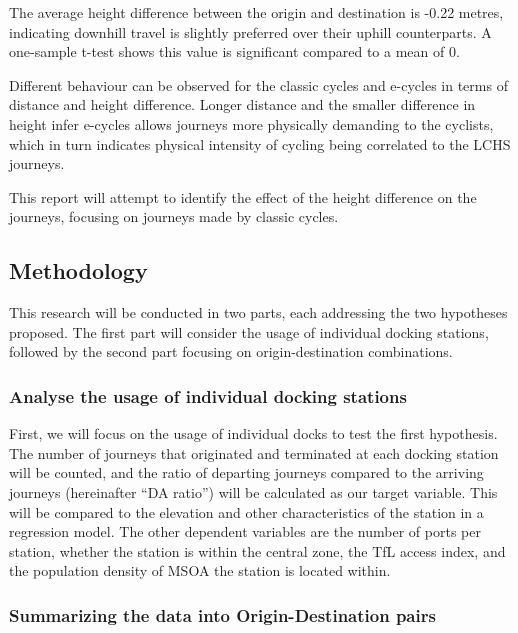 \documentclass[
  a4paper,
  DIV=11,
  numbers=noendperiod]{scrartcl}
\begin{document}
The average height difference between the origin and destination is
-0.22 metres, indicating downhill travel is slightly preferred over
their uphill counterparts. A one-sample t-test shows this value is
significant compared to a mean of 0.

Different behaviour can be observed for the classic cycles and e-cycles
in terms of distance and height difference. Longer distance and the
smaller difference in height infer e-cycles allows journeys more
physically demanding to the cyclists, which in turn indicates physical
intensity of cycling being correlated to the LCHS journeys.

This report will attempt to identify the effect of the height difference
on the journeys, focusing on journeys made by classic cycles.

\hypertarget{methodology}{%
\subsection{Methodology}\label{methodology}}

This research will be conducted in two parts, each addressing the two
hypotheses proposed. The first part will consider the usage of
individual docking stations, followed by the second part focusing on
origin-destination combinations.

\hypertarget{analyse-the-usage-of-individual-docking-stations}{%
\subsubsection{Analyse the usage of individual docking
stations}\label{analyse-the-usage-of-individual-docking-stations}}

First, we will focus on the usage of individual docks to test the first
hypothesis. The number of journeys that originated and terminated at
each docking station will be counted, and the ratio of departing
journeys compared to the arriving journeys (hereinafter ``DA ratio'')
will be calculated as our target variable. This will be compared to the
elevation and other characteristics of the station in a regression
model. The other dependent variables are the number of ports per
station, whether the station is within the central zone, the TfL access
index, and the population density of MSOA the station is located within.

\hypertarget{summarizing-the-data-into-origin-destination-pairs}{%
\subsubsection{Summarizing the data into Origin-Destination
pairs}\label{summarizing-the-data-into-origin-destination-pairs}}
\end{document}

